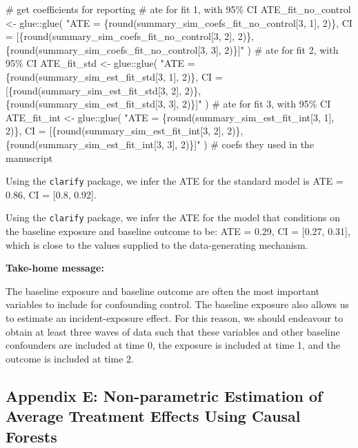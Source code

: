 \documentclass[
  singlecolumn]{article}
\newenvironment{Shaded}{}{}
\newcommand{\CommentTok}[1]{\textcolor[rgb]{0.42,0.45,0.49}{#1}}
\newcommand{\FunctionTok}[1]{\textcolor[rgb]{0.44,0.26,0.76}{#1}}
\newcommand{\NormalTok}[1]{\textcolor[rgb]{0.14,0.16,0.18}{#1}}
\newcommand{\OtherTok}[1]{\textcolor[rgb]{0.44,0.26,0.76}{#1}}
\newcommand{\SpecialCharTok}[1]{\textcolor[rgb]{0.00,0.36,0.77}{#1}}
\newcommand{\StringTok}[1]{\textcolor[rgb]{0.01,0.18,0.38}{#1}}
\begin{document}
\begin{Shaded}
\begin{Highlighting}[]
\CommentTok{\# get coefficients for reporting}
\CommentTok{\# ate for fit 1, with 95\% CI}
\NormalTok{ATE\_fit\_no\_control  }\OtherTok{\textless{}{-}}\NormalTok{ glue}\SpecialCharTok{::}\FunctionTok{glue}\NormalTok{(}
  \StringTok{"ATE = \{round(summary\_sim\_coefs\_fit\_no\_control[3, 1], 2)\}, }
\StringTok{  CI = [\{round(summary\_sim\_coefs\_fit\_no\_control[3, 2], 2)\},}
\StringTok{  \{round(summary\_sim\_coefs\_fit\_no\_control[3, 3], 2)\}]"}
\NormalTok{)}
\CommentTok{\# ate for fit 2, with 95\% CI}
\NormalTok{ATE\_fit\_std }\OtherTok{\textless{}{-}}\NormalTok{ glue}\SpecialCharTok{::}\FunctionTok{glue}\NormalTok{(}
  \StringTok{"ATE = \{round(summary\_sim\_est\_fit\_std[3, 1], 2)\}, }
\StringTok{  CI = [\{round(summary\_sim\_est\_fit\_std[3, 2], 2)\},}
\StringTok{  \{round(summary\_sim\_est\_fit\_std[3, 3], 2)\}]"}
\NormalTok{)}
\CommentTok{\# ate for fit 3, with 95\% CI}
\NormalTok{ATE\_fit\_int }\OtherTok{\textless{}{-}}
\NormalTok{  glue}\SpecialCharTok{::}\FunctionTok{glue}\NormalTok{(}
    \StringTok{"ATE = \{round(summary\_sim\_est\_fit\_int[3, 1], 2)\},}
\StringTok{    CI = [\{round(summary\_sim\_est\_fit\_int[3, 2], 2)\},}
\StringTok{    \{round(summary\_sim\_est\_fit\_int[3, 3], 2)\}]"}
\NormalTok{  )}
\CommentTok{\# coefs they used in the manuscript}
\end{Highlighting}
\end{Shaded}

Using the \texttt{clarify} package, we infer the ATE for the standard
model is ATE = 0.86, CI = {[}0.8, 0.92{]}.

Using the \texttt{clarify} package, we infer the ATE for the model that
conditions on the baseline exposure and baseline outcome to be: ATE =
0.29, CI = {[}0.27, 0.31{]}, which is close to the values supplied to
the data-generating mechanism.

\textbf{Take-home message:}

The baseline exposure and baseline outcome are often the most important
variables to include for confounding control. The baseline exposure also
allows us to estimate an incident-exposure effect. For this reason, we
should endeavour to obtain at least three waves of data such that these
variables and other baseline confounders are included at time 0, the
exposure is included at time 1, and the outcome is included at time 2.

\newpage{}

\subsection{Appendix E: Non-parametric Estimation of Average Treatment
Effects Using Causal Forests}\label{appendix-causal-forests}
\end{document}
